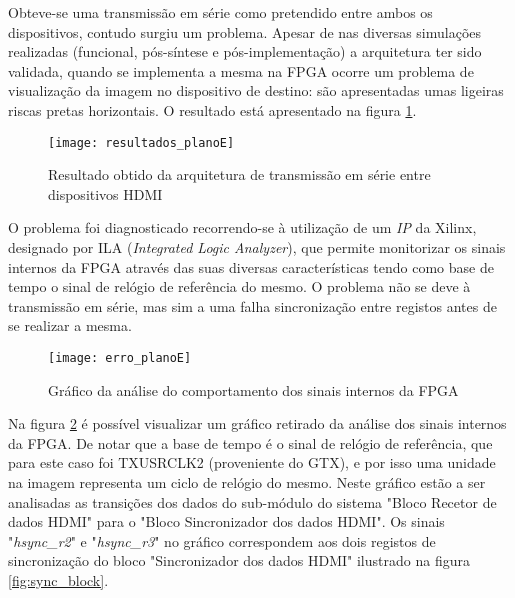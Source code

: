 
Obteve-se uma transmissão em série como pretendido entre ambos os dispositivos, contudo surgiu um problema. Apesar de nas diversas simulações realizadas (funcional, pós-síntese e pós-implementação) a arquitetura ter sido validada, quando se implementa a mesma na FPGA ocorre um problema de visualização da imagem no dispositivo de destino: são apresentadas umas ligeiras riscas pretas horizontais. O resultado está apresentado na figura \ref{fig:planoE_results}.


\begin{figure}
	\begin{center}
	\leavevmode
	\texttt{[image: resultados\_planoE]}
	\captionsetup{width=1.0\linewidth}
	\caption[Resultado obtido da arquitetura de transmissão em série entre dispositivos HDMI]{Resultado obtido da arquitetura de transmissão em série entre dispositivos HDMI}
	\label{fig:planoE_results}
\end{center}
\end{figure}

O problema foi diagnosticado recorrendo-se à utilização de um \textit{IP} da Xilinx, designado por ILA (\textit{Integrated Logic Analyzer}), que permite monitorizar os sinais internos da FPGA através das suas diversas características tendo como base de tempo o sinal de relógio de referência do mesmo. O problema não se deve à transmissão em série, mas sim a uma falha sincronização entre registos antes de se realizar a mesma.

\begin{figure}
	\begin{center}
		\leavevmode
		\texttt{[image: erro\_planoE]}
		\captionsetup{width=1.0\linewidth}
		\caption[Gráfico da análise do comportamento dos sinais internos da FPGA]{Gráfico da análise do comportamento dos sinais internos da FPGA}
		\label{fig:planoE_rerro}
	\end{center}
\end{figure}

Na figura \ref{fig:planoE_rerro} é possível visualizar um gráfico retirado da análise dos sinais internos da FPGA. De notar que a base de tempo é o sinal de relógio de referência, que para este caso foi TXUSRCLK2 (proveniente do GTX), e por isso uma unidade na imagem representa um ciclo de relógio do mesmo.  Neste gráfico estão a ser analisadas as transições dos dados do sub-módulo do sistema "Bloco Recetor de dados HDMI" para o "Bloco Sincronizador dos dados HDMI". Os sinais "\textit{hsync\_r2}" e "\textit{hsync\_r3}" no gráfico correspondem aos dois registos de sincronização do bloco "Sincronizador dos dados HDMI" ilustrado na figura \ref{fig:sync_block}.

